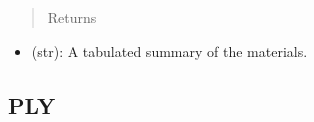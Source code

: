 \documentclass[letterpaper,10pt,english]{sphinxmanual}
\begin{document}
\begin{fulllineitems}
\begin{fulllineitems}
\begin{itemize}
\end{itemize}
\begin{quote}\begin{description}
\item[{Returns}] \leavevmode
\end{description}\end{quote}
\begin{itemize}
\item {} 
(str): A tabulated summary of the materials.

\end{itemize}

\end{fulllineitems}


\end{fulllineitems}



\subsection{PLY}
\label{structures:ply}
\end{document}

